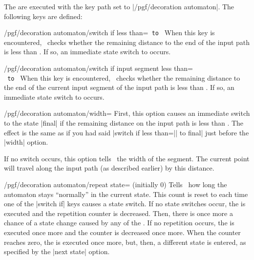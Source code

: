 \begin{command}{\pgfdeclaredecoration{}}
\begin{command}{\state{}}
        The  are executed with the key path set to
        |/pgf/decoration automaton|. The following keys are defined:
        \begin{key}{/pgf/decoration automaton/switch if less than=\texttt{ to }}
            When this key is encountered, \pgfname\ checks whether the
            remaining distance to the end of the input path is less than
            . If so, an immediate state switch to  occurs.
        \end{key}
        \begin{key}{/pgf/decoration automaton/switch if input segment less than=\\\texttt{ to }}
            When this key is encountered, \pgfname\ checks whether the
            remaining distance to the end of the current input segment of the
            input path is less than . If so, an immediate state
            switch to  occurs.
        \end{key}
        \begin{key}{/pgf/decoration automaton/width=}
            First, this option causes an immediate switch to the state |final|
            if the remaining distance on the input path is less than
            . The effect is the same as if you had said 
            |switch if less than=|| to final| just before the
            |width| option.

            If no switch occurs, this option tells \pgfname\ the width of the
            segment. The current point will travel along the input path (as
            described earlier) by this distance.
        \end{key}
        \begin{key}{/pgf/decoration automaton/repeat state= (initially 0)}
            Tells \pgfname\ how long the automaton stays ``normally'' in the
            current state. This count is reset to  each time
            one of the |switch if| keys causes a state switch. If no state
            switches occur, the  is executed and the repetition
            counter is decreased. Then, there is once more a chance of a state
            change caused by any of the . If no repetition
            occurs, the  is executed once more and the counter is
            decreased once more. When the counter reaches zero, the 
            is executed once more, but, then, a different state is entered, as
            specified by the |next state| option.


\end{key}
\end{command}
\end{command}
